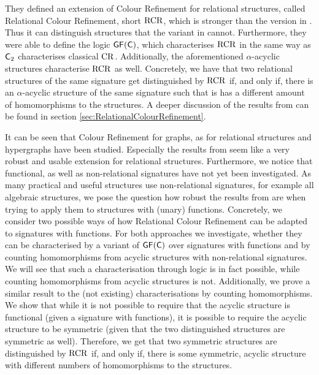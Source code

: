 They defined an extension of Colour Refinement for relational structures, called Relational Colour Refinement, short $\operatorname{RCR}$, which is stronger than the version in \cite{butti2021FractionalHomomorphism}.
Thus it can distinguish structures that the variant in \cite{butti2021FractionalHomomorphism} cannot.
Furthermore, they were able to define the logic $\mathsf{GF}(\mathsf{C})$, which characterises $\operatorname{RCR}$ in the same way as $\mathsf{C}_{2}$ characterises classical $\operatorname{CR}$.
Additionally, the aforementioned $\alpha$-acyclic structures characterise $\operatorname{RCR}$ as well.
Concretely, we have that two relational structures of the same signature get distinguished by $\operatorname{RCR}$ if, and only if, there is an $\alpha$-acyclic structure of the same signature such that is has a different amount of homomorphisms to the structures.
A deeper discussion of the results from \cite{scheidt2025ColorRefinement} can be found in section \ref{sec:RelationalColourRefinement}.


It can be seen that Colour Refinement for graphs, as for relational structures and hypergraphs have been studied.
Especially the results from \cite{scheidt2025ColorRefinement} seem like a very robust and usable extension for relational structures.
Furthermore, we notice that functional, as well as non-relational signatures have not yet been investigated.
As many practical and useful structures use non-relational signatures, for example all algebraic structures, we pose the question how robust the results from \cite{scheidt2025ColorRefinement} are when trying to apply them to structures with (unary) functions.
Concretely, we consider two possible ways of how Relational Colour Refinement can be adapted to signatures with functions.
For both approaches we investigate, whether they can be characterised by a variant of $\mathsf{GF}(\mathsf{C})$ over signatures with functions and by counting homomorphisms from acyclic structures with non-relational signatures.
We will see that such a characterisation through logic is in fact possible, while counting homomorphisms from acyclic structures is not.
Additionally, we prove a similar result to the (not existing) characterisations by counting homomorphisms.
We show that while it is not possible to require that the acyclic structure is functional (given a signature with functions), it is possible to require the acyclic structure to be symmetric (given that the two distinguished structures are symmetric as well).
Therefore, we get that two symmetric structures are distinguished by $\operatorname{RCR}$ if, and only if, there is some symmetric, acyclic structure with different numbers of homomorphisms to the structures.

